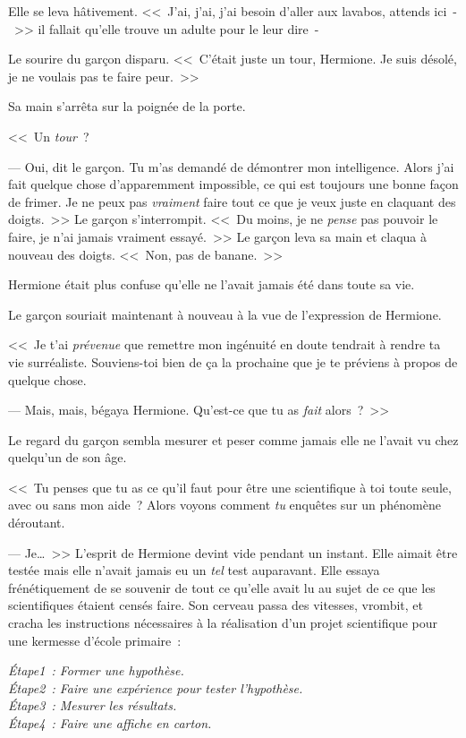 Elle se leva hâtivement. <<~J'ai, j'ai, j'ai besoin d'aller aux lavabos, attends ici~-~>> il fallait qu'elle trouve un adulte pour le leur dire~-

Le sourire du garçon disparu. <<~C'était juste un tour, Hermione. Je suis désolé, je ne voulais pas te faire peur.~>>

Sa main s'arrêta sur la poignée de la porte.

<<~Un \emph{tour}~?

--- Oui, dit le garçon. Tu m'as demandé de démontrer mon intelligence. Alors j'ai fait quelque chose d'apparemment impossible, ce qui est toujours une bonne façon de frimer. Je ne peux pas \emph{vraiment} faire tout ce que je veux juste en claquant des doigts.~>> Le garçon s'interrompit. <<~Du moins, je ne \emph{pense} pas pouvoir le faire, je n'ai jamais vraiment essayé.~>> Le garçon leva sa main et claqua à nouveau des doigts. <<~Non, pas de banane.~>>

Hermione était plus confuse qu'elle ne l'avait jamais été dans toute sa vie.

Le garçon souriait maintenant à nouveau à la vue de l'expression de Hermione.

<<~Je t'ai \emph{prévenue} que remettre mon ingénuité en doute tendrait à rendre ta vie surréaliste. Souviens-toi bien de ça la prochaine que je te préviens à propos de quelque chose.

--- Mais, mais, bégaya Hermione. Qu'est-ce que tu as \emph{fait} alors~?~>>

Le regard du garçon sembla mesurer et peser comme jamais elle ne l'avait vu chez quelqu'un de son âge.

<<~Tu penses que tu as ce qu'il faut pour être une scientifique à toi toute seule, avec ou sans mon aide~? Alors voyons comment \emph{tu} enquêtes sur un phénomène déroutant.

--- Je…~>> L'esprit de Hermione devint vide pendant un instant. Elle aimait être testée mais elle n'avait jamais eu un \emph{tel} test auparavant. Elle essaya frénétiquement de se souvenir de tout ce qu'elle avait lu au sujet de ce que les scientifiques étaient censés faire. Son cerveau passa des vitesses, vrombit, et cracha les instructions nécessaires à la réalisation d'un projet scientifique pour une kermesse d'école primaire~:

\emph{Étape1~: Former une hypothèse.\\
Étape2~: Faire une expérience pour tester l'hypothèse.\\
Étape3~: Mesurer les résultats.\\
Étape4~: Faire une affiche en carton.}

